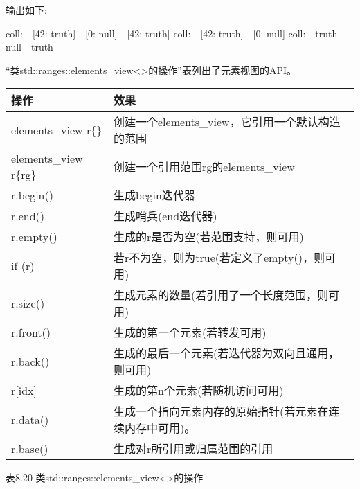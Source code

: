 输出如下:

\begin{shell}
coll:
- [42: truth]
- [0: null]
- [42: truth]
coll:
- [42: truth]
- [0: null]
coll:
- truth
- null
- truth
\end{shell}


“类std::ranges::elements\_view<>的操作”表列出了元素视图的API。

\begin{longtable}[c]{|l|l|}
\hline
\textbf{操作}     & \textbf{效果}                                                \\ \hline
\endfirsthead
%
\endhead
%
elements\_view r\{\} & 创建一个elements\_view，它引用一个默认构造的范围                               \\ \hline
elements\_view r\{rg\} & 创建一个引用范围rg的elements\_view              \\ \hline
r.begin()              & 生成begin迭代器                                      \\ \hline
r.end()                & 生成哨兵(end迭代器)                             \\ \hline
r.empty()              & 生成的r是否为空(若范围支持，则可用) \\ \hline
if (r)                 & 若r不为空，则为true(若定义了empty()，则可用)        \\ \hline
r.size()             & 生成元素的数量(若引用了一个长度范围，则可用)                             \\ \hline
r.front()              & 生成的第一个元素(若转发可用)              \\ \hline
r.back()               & 生成的最后一个元素(若迭代器为双向且通用，则可用) \\ \hline
r{[}idx{]}             & 生成的第n个元素(若随机访问可用)            \\ \hline
r.data()             & 生成一个指向元素内存的原始指针(若元素在连续内存中可用)。 \\ \hline
r.base()               & 生成对r所引用或归属范围的引用       \\ \hline
\end{longtable}

\begin{center}
表8.20 类std::ranges::elements\_view<>的操作
\end{center}

